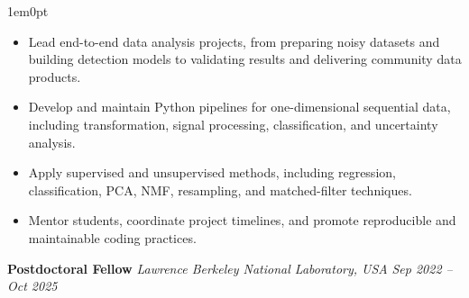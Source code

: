 \documentclass[a4paper,10pt]{article}
\begin{document}
\vspace{1.5mm}
\begin{adjustwidth}{1em}{0pt}
\begin{itemize}[leftmargin=*, itemsep=2pt]
    \item Lead end-to-end data analysis projects, from preparing noisy datasets and building detection models to validating results and delivering community data products.
    \item Develop and maintain Python pipelines for one-dimensional sequential data, including transformation, signal processing, classification, and uncertainty analysis.
    \item Apply supervised and unsupervised methods, including regression, classification, PCA, NMF, resampling, and matched-filter techniques.
    \item Mentor students, coordinate project timelines, and promote reproducible and maintainable coding practices.
\end{itemize}
\end{adjustwidth}

\vspace{1.5mm}

\textcolor{sectionblue}{\textbf{Postdoctoral Fellow}} \hfill
\textcolor{sectionblue}{\textit{Lawrence Berkeley National Laboratory, USA}} \hfill
\textcolor{sectionblue}{\textit{Sep 2022 -- Oct 2025}}
\end{document}
